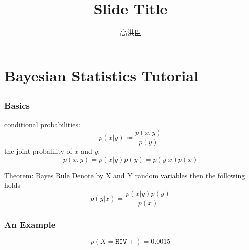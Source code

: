 

\title[Slide Title]{Slide Title}
\author{高洪臣}




\begin{frame}
    \titlepage
\end{frame}

\section{Bayesian Statistics Tutorial}
\subsection{}
\begin{frame}
    \frametitle{Basics}
    conditional probabilities:
    $$
    p(x|y) \coloneqq \frac{p(x,y)}{p(y)}
    $$
    the joint probalility of $x$ and $y$:
    $$
    p(x,y)=p(x|y)p(y)=p(y|x)p(x)
    $$

    \begin{block}{Theorem: Bayes Rule}
    Denote by X and Y random variables then the following holds
    $$
    p(y|x)=\frac{p(x|y)p(y)}{p(x)}
    $$
    \end{block}

\end{frame}

\begin{frame}
    \frametitle{An Example}


    $$
    p(X = \mathtt{HIV+}) = 0.0015
    $$
\end{frame}


